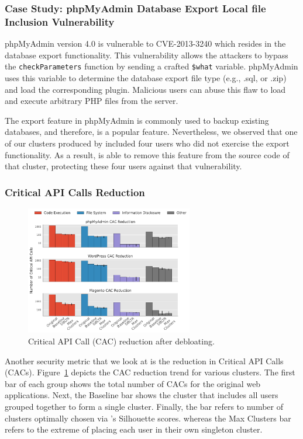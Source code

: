 \subsubsection{Case Study: phpMyAdmin Database Export Local file Inclusion Vulnerability}

phpMyAdmin version 4.0 is vulnerable to CVE-2013-3240 which resides in the database export functionality. 
This vulnerability allows the attackers to bypass the \texttt{checkParameters} function by sending a crafted \texttt{\$what} variable. 
phpMyAdmin uses this variable to determine the database export file type (e.g., .sql, or .zip) and load the corresponding plugin. 
Malicious users can abuse this flaw to load and execute arbitrary PHP files from the server. 

The export feature in phpMyAdmin is commonly used to backup existing databases, and therefore, is a popular feature. 
Nevertheless, we observed that one of our clusters produced by \sys{} included four users who did not exercise the export functionality. As a result, \sys{} is able to remove this feature from the source code of that cluster, protecting these four users against that vulnerability. 

\subsubsection{Critical API Calls Reduction}

\begin{figure}[t]
    \centering
    \includegraphics[width=0.65\textwidth]{figures/dbltr/cac_reduction.pdf}
    \caption{Critical API Call (CAC) reduction after debloating.}
    \label{fig:cac_reduction}
\end{figure}

Another security metric that we look at is the reduction in Critical API Calls (CACs). 
Figure~\ref{fig:cac_reduction} depicts the CAC reduction trend for various clusters. 
The first bar of each group shows the total number of CACs for the original web applications.
Next, the Baseline bar shows the cluster that includes all users grouped together to form a single cluster. 
Finally, the \sys{} bar refers to number of clusters optimally chosen via \sys{}'s Silhouette scores. whereas the Max Clusters bar refers to the extreme of placing each user in their own singleton cluster.


